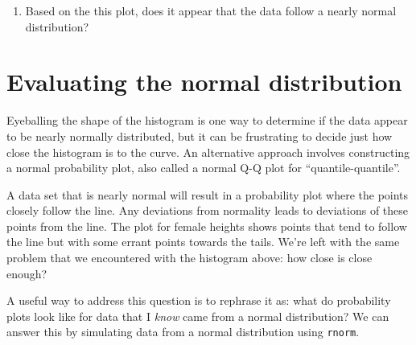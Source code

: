 \documentclass[]{book}
\newenvironment{Shaded}{\begin{snugshade}}{\end{snugshade}}
\newcommand{\KeywordTok}[1]{\textcolor[rgb]{0.13,0.29,0.53}{\textbf{{#1}}}}
\newcommand{\DataTypeTok}[1]{\textcolor[rgb]{0.13,0.29,0.53}{{#1}}}
\newcommand{\StringTok}[1]{\textcolor[rgb]{0.31,0.60,0.02}{{#1}}}
\newcommand{\NormalTok}[1]{{#1}}
\providecommand{\tightlist}{%
  \setlength{\itemsep}{0pt}\setlength{\parskip}{0pt}}
\theoremstyle{definition}
\theoremstyle{definition}
\theoremstyle{remark}
\begin{document}
\begin{enumerate}
\def\labelenumi{\arabic{enumi}.}
\setcounter{enumi}{1}
\tightlist
\item
  Based on the this plot, does it appear that the data follow a nearly
  normal distribution?
\end{enumerate}

\section*{Evaluating the normal
distribution}\label{evaluating-the-normal-distribution}

Eyeballing the shape of the histogram is one way to determine if the
data appear to be nearly normally distributed, but it can be frustrating
to decide just how close the histogram is to the curve. An alternative
approach involves constructing a normal probability plot, also called a
normal Q-Q plot for ``quantile-quantile''.

\begin{Shaded}
\end{Shaded}

A data set that is nearly normal will result in a probability plot where
the points closely follow the line. Any deviations from normality leads
to deviations of these points from the line. The plot for female heights
shows points that tend to follow the line but with some errant points
towards the tails. We're left with the same problem that we encountered
with the histogram above: how close is close enough?

A useful way to address this question is to rephrase it as: what do
probability plots look like for data that I \emph{know} came from a
normal distribution? We can answer this by simulating data from a normal
distribution using \texttt{rnorm}.

\begin{Shaded}
\end{Shaded}
\end{document}
